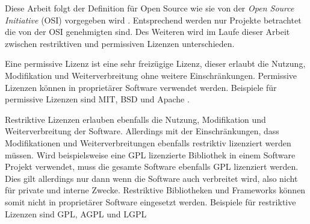 Diese Arbeit folgt der Definition für Open Source wie sie von der \textit{Open Source Initiative}
(OSI) vorgegeben wird \cite{OpenSourceDefinition}. Entsprechend werden nur Projekte betrachtet die 
von der OSI genehmigten sind. Des Weiteren wird im Laufe dieser Arbeit zwischen restriktiven und 
permissiven Lizenzen unterschieden.

Eine permissive Lizenz ist eine sehr freizügige Lizenz, dieser erlaubt die Nutzung, Modifikation
und Weiterverbreitung ohne weitere Einschränkungen. Permissive Lizenzen können in proprietärer
Software verwendet werden. Beispiele für permissive Lizenzen sind MIT, BSD und Apache 
\cite{OpenSourceDefinition}.

Restriktive Lizenzen erlauben ebenfalls die Nutzung, Modifikation und Weiterverbreitung der Software.
Allerdings mit der Einschränkungen, dass Modifikationen und Weiterverbreitungen ebenfalls restriktiv 
lizenziert werden müssen. Wird beispielsweise eine GPL lizenzierte Bibliothek in einem Software Projekt
verwendet, muss die gesamte Software ebenfalls GPL lizenziert werden. Dies gilt allerdings nur dann
wenn die Software auch verbreitet wird, also nicht für private und interne Zwecke. Restriktive 
Bibliotheken und Frameworks können somit nicht in proprietärer Software eingesetzt werden.
Beispiele für restriktive Lizenzen sind GPL, AGPL und LGPL \cite{OpenSourceDefinition}





\newpage
